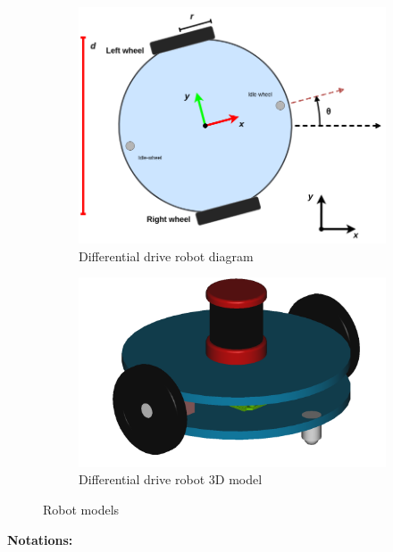 \documentclass[../main.tex]{subfiles}
\begin{document}
\begin{figure}[H]
	\centering
	\begin{subfigure}{0.45\textwidth}
		\centering
		\includegraphics[width=\textwidth]{IMAGES/part2/robot_model.png}
		\caption{Differential drive robot diagram}
		\label{fig:robot_model}
	\end{subfigure}
	\hfill
	\begin{subfigure}{0.45\textwidth}
		\centering
		\includegraphics[width=\textwidth]{IMAGES/part2/robot_3Dmodel.png}
		\caption{Differential drive robot 3D model}
		\label{fig:robot_3Dmodel}
	\end{subfigure}
	\caption{Robot models}
\end{figure}

\textbf{Notations:}
\end{document}
